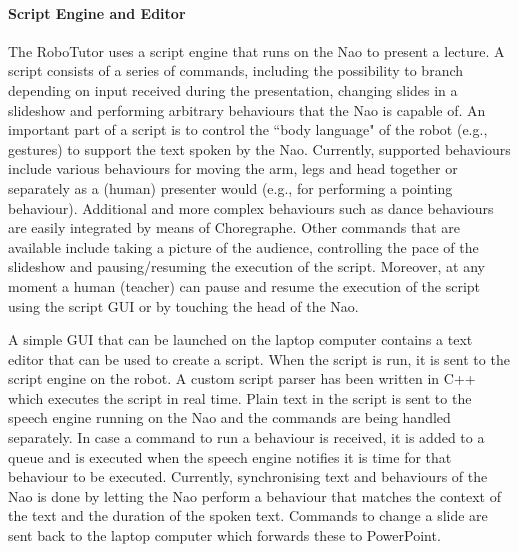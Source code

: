 \paragraph{Script Engine and Editor}
The RoboTutor uses a script engine that runs on the Nao to present a lecture. A script consists of a series of commands, including the possibility to branch depending on input received during the presentation, changing slides in a slideshow and performing arbitrary behaviours that the Nao is capable of. An important part of a script is to control the ``body language" of the robot (e.g., gestures) to support the text spoken by the Nao. Currently, supported behaviours include various behaviours for moving the arm, legs and head together or separately as a (human) presenter would (e.g., for performing a pointing behaviour). Additional and more complex behaviours such as dance behaviours are easily integrated by means of Choregraphe. %
 Other commands that are available include taking a picture of the audience, controlling the pace of the slideshow and pausing/resuming the execution of the script. Moreover, at any moment a human (teacher) can pause and resume the execution of the script using the script GUI or by touching the head of the Nao.

A simple GUI that can be launched on the laptop computer contains a text editor that can be used to create a script. %
When the script is run, it is sent to the script engine on the robot. A custom script parser has been written in C++ which executes the script in real time. Plain text in the script is sent to the speech engine running on the Nao and the commands are being handled separately. In case a command to run a behaviour is received, it is added to a queue and is executed when the speech engine notifies it is time for that behaviour to be executed. Currently, synchronising text and behaviours of the Nao is done by letting the Nao perform a behaviour that matches the context of the text and the duration of the spoken text. Commands to change a slide are sent back to the laptop computer which forwards these to PowerPoint.

%
